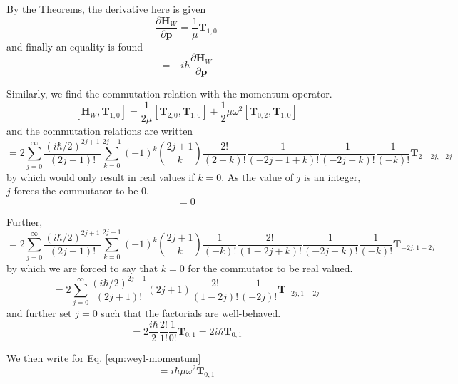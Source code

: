 \documentclass[a4paper]{article}
\theoremstyle{definition}
\begin{document}
By the Theorems, the derivative here is given
\begin{equation}
	\frac{\partial\textbf{H}_{W}}{\partial\textbf{p}}=\frac{1}{\mu}\textbf{T}_{1,0}
\end{equation}
and finally an equality is found
\begin{equation}
	[\textbf{H}_W,\textbf{q}]=-i\hbar\frac{\partial\textbf{H}_{W}}{\partial\textbf{p}}
\end{equation}

Similarly, we find the commutation relation with the momentum operator.
\begin{equation}\label{eqn:weyl-momentum}
	[\textbf{H}_W,\textbf{T}_{1,0}]=\frac{1}{2\mu}[\textbf{T}_{2,0},\textbf{T}_{1,0}]+\frac{1}{2}\mu\omega^2[\textbf{T}_{0,2},\textbf{T}_{1,0}]
\end{equation}
and the commutation relations are written
\begin{equation}
	[\textbf{T}_{2,0},\textbf{T}_{1,0}]=2\sum_{j=0}^\infty\frac{(i\hbar/2)^{2j+1}}{(2j+1)!}\sum_{k=0}^{2j+1}(-1)^k\binom{2j+1}{k}\frac{2!}{(2-k)!}\frac{1}{(-2j-1+k)!}\frac{1}{(-2j+k)!}\frac{1}{(-k)!}\textbf{T}_{2-2j,-2j}
\end{equation}
by which would only result in real values if $k=0$. As the value of $j$ is an integer, $j$ forces the commutator to be 0.
\begin{equation}
	[\textbf{T}_{2,0},\textbf{T}_{1,0}]=0
\end{equation}

Further,
\begin{equation}
	[\textbf{T}_{0,2},\textbf{T}_{1,0}]=2\sum_{j=0}^\infty\frac{(i\hbar/2)^{2j+1}}{(2j+1)!}\sum_{k=0}^{2j+1}(-1)^k\binom{2j+1}{k}\frac{1}{(-k)!}\frac{2!}{(1-2j+k)!}\frac{1}{(-2j+k)!}\frac{1}{(-k)!}\textbf{T}_{-2j,1-2j}
\end{equation}
by which we are forced to say that $k=0$ for the commutator to be real valued.
\begin{equation}
	[\textbf{T}_{0,2},\textbf{T}_{1,0}]=2\sum_{j=0}^\infty\frac{(i\hbar/2)^{2j+1}}{(2j+1)!}(2j+1)\frac{2!}{(1-2j)!}\frac{1}{(-2j)!}\textbf{T}_{-2j,1-2j}
\end{equation}
and further set $j=0$ such that the factorials are well-behaved.
\begin{equation}
	[\textbf{T}_{0,2},\textbf{T}_{1,0}]=2\frac{i\hbar}{2}\frac{2!}{1!}\frac{1}{0!}\textbf{T}_{0,1}=2i\hbar\textbf{T}_{0,1}
\end{equation}

We then write for Eq. \ref{eqn:weyl-momentum}
\begin{equation}
	[\textbf{H}_W,\textbf{T}_{1,0}]=i\hbar\mu\omega^2\textbf{T}_{0,1}
\end{equation}
\end{document}
